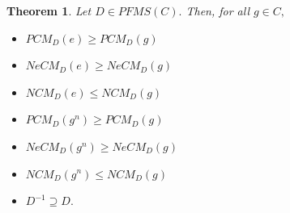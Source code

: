 \documentclass[12pt,letterpaper]{amsart}
\theoremstyle{plain}
\newtheorem{theorem}{Theorem}[section]
\theoremstyle{definition}
\numberwithin{equation}{section}
\begin{document}
\begin{theorem} \label{1}
Let $D \in PFMS(C).$ Then, for all $g \in C,$ \begin{itemize}
\item [i.] $PCM_{D}(e) \geq PCM_{D}(g)$ 
\item [ii.] $NeCM_{D}(e) \geq NeCM_{D}(g)$
\item [iii.] $NCM_{D}(e) \leq NCM_{D}(g)$
\item [iv.] $PCM_{D}(g^{n}) \geq PCM_{D}(g)$
\item [v.] $NeCM_{D}(g^n) \geq NeCM_{D}(g)$
\item [vi.] $NCM_{D}(g^n) \leq NCM_{D}(g)$
\item [vii.] $D^{-1} \supseteq D.$
\end{itemize}
\end{theorem}
\end{document}
